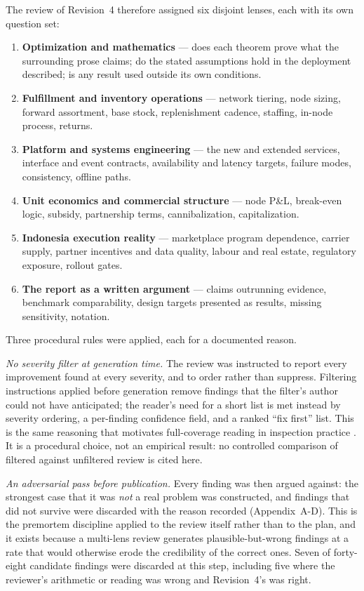 \documentclass[10pt,twocolumn,letterpaper]{article}
\theoremstyle{definition}
\begin{document}
The review of Revision~4 therefore assigned six disjoint lenses, each with its own question set:

\begin{enumerate}
\item \textbf{Optimization and mathematics} --- does each theorem prove what the surrounding prose claims; do the stated assumptions hold in the deployment described; is any result used outside its own conditions.
\item \textbf{Fulfillment and inventory operations} --- network tiering, node sizing, forward assortment, base stock, replenishment cadence, staffing, in-node process, returns.
\item \textbf{Platform and systems engineering} --- the new and extended services, interface and event contracts, availability and latency targets, failure modes, consistency, offline paths.
\item \textbf{Unit economics and commercial structure} --- node P\&L, break-even logic, subsidy, partnership terms, cannibalization, capitalization.
\item \textbf{Indonesia execution reality} --- marketplace program dependence, carrier supply, partner incentives and data quality, labour and real estate, regulatory exposure, rollout gates.
\item \textbf{The report as a written argument} --- claims outrunning evidence, benchmark comparability, design targets presented as results, missing sensitivity, notation.
\end{enumerate}

Three procedural rules were applied, each for a documented reason.

\emph{No severity filter at generation time.} The review was instructed to report every improvement found at every severity, and to order rather than suppress. Filtering instructions applied before generation remove findings that the filter's author could not have anticipated; the reader's need for a short list is met instead by severity ordering, a per-finding confidence field, and a ranked ``fix first'' list. This is the same reasoning that motivates full-coverage reading in inspection practice \cite{fagan1976,porter1995}. It is a procedural choice, not an empirical result: no controlled comparison of filtered against unfiltered review is cited here.

\emph{An adversarial pass before publication.} Every finding was then argued against: the strongest case that it was \emph{not} a real problem was constructed, and findings that did not survive were discarded with the reason recorded (Appendix~A-D). This is the premortem discipline \cite{klein2007} applied to the review itself rather than to the plan, and it exists because a multi-lens review generates plausible-but-wrong findings at a rate that would otherwise erode the credibility of the correct ones. Seven of forty-eight candidate findings were discarded at this step, including five where the reviewer's arithmetic or reading was wrong and Revision~4's was right.
\end{document}
